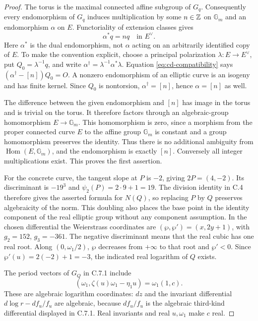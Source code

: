 \begin{proof}
The torus is the maximal connected affine subgroup of $G_q$.
Consequently every endomorphism of $G_q$ induces multiplication
by some $n\in\mathbb Z$ on $\mathbb G_m$ and an endomorphism
$\alpha$ on $E$. Functoriality of extension classes gives
\begin{equation}\label{eq:cd-compatibility}
 \alpha^*q=nq\quad\text{in }E^\vee.
\end{equation}
Here $\alpha^*$ is the dual endomorphism, not $\alpha$
acting on an arbitrarily identified copy of $E$. To make the
convention explicit, choose a principal polarization
$\lambda:E\to E^\vee$, put $Q_0=\lambda^{-1}q$, and
write $\alpha^\dagger=\lambda^{-1}\alpha^*\lambda$.
Equation \eqref{eq:cd-compatibility} says
$(\alpha^\dagger-[n])Q_0=O$. A nonzero endomorphism of an
elliptic curve is an isogeny and has finite kernel. Since
$Q_0$ is nontorsion, $\alpha^\dagger=[n]$, hence
$\alpha=[n]$ as well.

The difference between the given endomorphism and $[n]$ has
image in the torus and is trivial on the torus. It therefore
factors through an algebraic-group homomorphism
$E\to\mathbb G_m$. This homomorphism is zero, since a
morphism from the proper connected curve $E$ to the affine
group $\mathbb G_m$ is constant and a group homomorphism
preserves the identity. Thus there is no additional ambiguity
from $\operatorname{Hom}(E,\mathbb G_m)$, and the
endomorphism is exactly $[n]$. Conversely all integer
multiplications exist. This proves the first assertion.

For the concrete curve, the tangent slope at $P$ is $-2$,
giving $2P=(4,-2)$. Its discriminant is $-19^3$ and
$\psi_2(P)=2\cdot9+1=19$. The division identity in C.4
therefore gives the asserted formula for $N(Q)$, so replacing
$P$ by $Q$ preserves algebraicity of the norm. This doubling
also places the base point in the identity component of the
real elliptic group without any component assumption. In the
chosen differential the Weierstrass coordinates are
$(\wp,\wp')=(x,2y+1)$, with $g_2=152$, $g_3=-361$.
The negative discriminant means that the real cubic has one
real root. Along $(0,\omega_1/2)$, $\wp$ decreases from
$+\infty$ to that root and $\wp'<0$. Since
$\wp'(u)=2(-2)+1=-3$, the indicated real logarithm of $Q$
exists.

The period vectors of $G_Q$ in C.7.1 include
\[
 (\omega_1,\zeta(u)\omega_1-\eta_1u)
       =\omega_1(1,c).
\]
These are algebraic logarithm coordinates: $dz$ and the
invariant differential $d\log r-df_u/f_u$ are algebraic,
because $df_u/f_u$ is the algebraic third-kind differential
displayed in C.7.1. Real invariants and real $u,\omega_1$
make $c$ real.


\end{proof}
